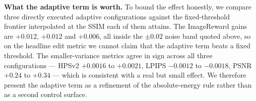 \noindent\textbf{What the adaptive term is worth.}
To bound the effect honestly, we compare three directly executed adaptive
configurations against the fixed-threshold frontier interpolated at the SSIM each
of them attains. The ImageReward gains are $+0.012$, $+0.012$ and $+0.006$, all
inside the $\pm 0.02$ noise band quoted above, so on the headline edit metric we
cannot claim that the adaptive term beats a fixed threshold. The
smaller-variance metrics agree in sign across all three configurations --- HPSv2
$+0.0016$ to $+0.0021$, LPIPS $-0.0012$ to $-0.0018$, PSNR $+0.24$ to $+0.34$
--- which is consistent with a real but small effect. We therefore present the
adaptive term as a refinement of the absolute-energy rule rather than as a
second control surface.
